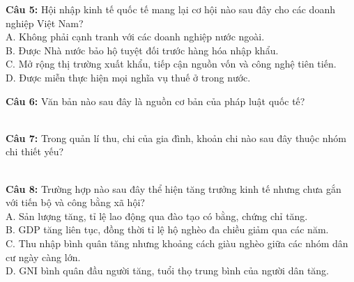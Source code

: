 \documentclass[12pt,a4paper]{article}
\begin{document}
\noindent \textbf{Câu 5:} Hội nhập kinh tế quốc tế mang lại cơ hội nào sau đây cho các doanh nghiệp Việt Nam?\\
\noindent A. Không phải cạnh tranh với các doanh nghiệp nước ngoài.\\
\noindent B. Được Nhà nước bảo hộ tuyệt đối trước hàng hóa nhập khẩu.\\
\noindent C. Mở rộng thị trường xuất khẩu, tiếp cận nguồn vốn và công nghệ tiên tiến.\\
\noindent D. Được miễn thực hiện mọi nghĩa vụ thuế ở trong nước.

\noindent \textbf{Câu 6:} Văn bản nào sau đây là nguồn cơ bản của pháp luật quốc tế?\\
\noindent{}\\
\noindent{}

\noindent \textbf{Câu 7:} Trong quản lí thu, chi của gia đình, khoản chi nào sau đây thuộc nhóm chi thiết yếu?\\
\noindent{}\\
\noindent{}

\noindent \textbf{Câu 8:} Trường hợp nào sau đây thể hiện tăng trưởng kinh tế nhưng chưa gắn với tiến bộ và công bằng xã hội?\\
\noindent A. Sản lượng tăng, tỉ lệ lao động qua đào tạo có bằng, chứng chỉ tăng.\\
\noindent B. GDP tăng liên tục, đồng thời tỉ lệ hộ nghèo đa chiều giảm qua các năm.\\
\noindent C. Thu nhập bình quân tăng nhưng khoảng cách giàu nghèo giữa các nhóm dân cư ngày càng lớn.\\
\noindent D. GNI bình quân đầu người tăng, tuổi thọ trung bình của người dân tăng.
\end{document}
